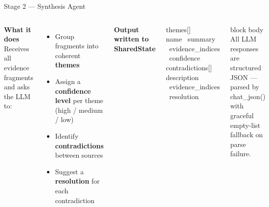\documentclass[aspectratio=169, 10pt]{beamer}
\newcommand{\code}[1]{{\ttfamily\small\color{code-red}#1}}
\newenvironment{hlbox}{%
  \begin{beamercolorbox}[rounded=true, sep=4pt, wd=\linewidth]{block body}%
    \small}{%
  \end{beamercolorbox}}
\begin{document}
\begin{frame}{Stage 2 --- Synthesis Agent}
  \begin{columns}[T]
      \textbf{\color{aims-green}What it does}\\[0.3em]
      Receives all evidence fragments and asks the LLM to:
      \begin{itemize}
        \item Group fragments into coherent \textbf{themes}
        \item Assign a \textbf{confidence level} per theme\\(\code{high / medium / low})
        \item Identify \textbf{contradictions} between sources
        \item Suggest a \textbf{resolution} for each contradiction
      \end{itemize}
      \textbf{\color{aims-green}Output written to SharedState}
      \vspace{0.3em}
      \begin{block}{}
        \scriptsize
        \code{themes[]}\\
        \hspace{1em}name \textbullet\ summary \textbullet\ evidence\_indices \textbullet\ confidence\\[0.4em]
        \code{contradictions[]}\\
        \hspace{1em}description \textbullet\ evidence\_indices \textbullet\ resolution
      \end{block}
      \vspace{0.3em}
      \begin{hlbox}
        \scriptsize All LLM responses are structured JSON --- parsed by
        \code{chat\_json()} with graceful empty-list fallback on parse failure.
      \end{hlbox}
  \end{columns}
\end{frame}
\end{document}
